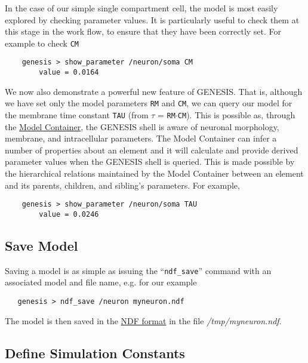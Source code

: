 \documentclass[12pt]{article}
\begin{document}
In the case of our simple single compartment cell, the model is most easily explored by checking parameter values. It is particularly useful to check them at this stage in the work flow, to ensure that they have been correctly set. For example to check {\tt CM}
\begin{verbatim}
    genesis > show_parameter /neuron/soma CM
        value = 0.0164
\end{verbatim}

We now also demonstrate a powerful new feature of GENESIS. That is, although we have set only the model parameters {\tt RM} and {\tt CM}, we can query our model for the membrane time constant {\tt TAU} (from $\tau$ = {\tt RM}$\cdot${\tt CM}). This is possible as, through the \href{../model-container/model-container.tex}{Model Container}, the GENESIS shell is aware of neuronal morphology, membrane, and intracellular parameters. The Model Container can infer a number of properties about an element and it will calculate and provide derived parameter values when the GENESIS shell is queried. This is made possible by the hierarchical relations maintained by the Model Container between an element and its parents, children, and sibling's parameters. For example,
\begin{verbatim}
    genesis > show_parameter /neuron/soma TAU
        value = 0.0246
\end{verbatim}

\subsection*{Save Model}

Saving a model is as simple as issuing the ``{\tt ndf\_save}'' command with an associated model and file name, e.g. for our example
\begin{verbatim}
   genesis > ndf_save /neuron myneuron.ndf
\end{verbatim}
The model is then saved in the \href{../ndf-file-format/ndf-file-format.tex}{NDF format} in the file {\it /tmp/myneuron.ndf}.

\subsection*{Define Simulation Constants}
\end{document}
